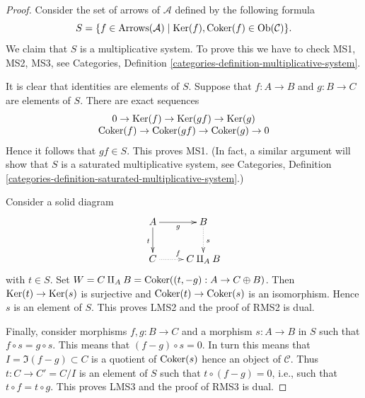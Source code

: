 \begin{proof}
Consider the set of arrows of $\mathcal{A}$ defined by
the following formula
$$
S = \{f \in \text{Arrows}(\mathcal{A}) \mid
\mathop{\mathrm{Ker}}(f), \mathop{\mathrm{Coker}}(f) \in \mathop{\mathrm{Ob}}\nolimits(\mathcal{C}) \}.
$$
We claim that $S$ is a multiplicative system. To prove this we have
to check MS1, MS2, MS3, see
Categories, Definition \ref{categories-definition-multiplicative-system}.

\medskip\noindent
It is clear that identities are elements of $S$. Suppose that
$f : A \to B$ and $g : B \to C$ are elements of $S$.
There are exact sequences
$$
\begin{matrix}
0 \to \mathop{\mathrm{Ker}}(f) \to \mathop{\mathrm{Ker}}(gf) \to \mathop{\mathrm{Ker}}(g) \\
\mathop{\mathrm{Coker}}(f) \to \mathop{\mathrm{Coker}}(gf) \to \mathop{\mathrm{Coker}}(g) \to 0
\end{matrix}
$$
Hence it follows that $gf \in S$. This proves MS1. (In fact, a similar
argument will show that $S$ is a saturated multiplicative system, see
Categories, Definition
\ref{categories-definition-saturated-multiplicative-system}.)

\medskip\noindent
Consider a solid diagram
$$
\xymatrix{
A \ar[d]_t \ar[r]_g & B \ar@{..>}[d]^s \\
C \ar@{..>}[r]^f & C \amalg_A B
}
$$
with $t \in S$. Set
$W = C \amalg_A B =  \mathop{\mathrm{Coker}}((t, -g) : A \to C \oplus B)$.
Then $\mathop{\mathrm{Ker}}(t) \to \mathop{\mathrm{Ker}}(s)$ is surjective and
$\mathop{\mathrm{Coker}}(t) \to \mathop{\mathrm{Coker}}(s)$ is an isomorphism. Hence
$s$ is an element of $S$. This proves LMS2 and the proof of RMS2 is dual.

\medskip\noindent
Finally, consider morphisms $f, g : B \to C$ and a morphism $s : A \to B$
in $S$ such that $f \circ s = g \circ s$. This means that
$(f - g) \circ s = 0$. In turn this means that
$I = \Im(f - g) \subset C$ is a quotient of $\mathop{\mathrm{Coker}}(s)$
hence an object of $\mathcal{C}$. Thus $t : C \to C' = C/I$ is an
element of $S$ such that $t \circ (f - g) = 0$, i.e., such that
$t \circ f = t \circ g$. This proves LMS3 and the proof of
RMS3 is dual.


\end{proof}
